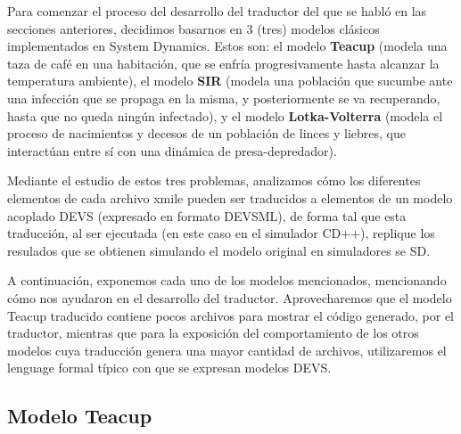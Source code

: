 Para comenzar el proceso del desarrollo del traductor del que se habló en las secciones anteriores, decidimos basarnos en 3 (tres) modelos clásicos implementados en System Dynamics. Estos son: el modelo \textbf{Teacup} (modela una taza de café en una habitación, que se enfría progresivamente hasta alcanzar la temperatura ambiente), el modelo \textbf{SIR} (modela una población que sucumbe ante una infección que se propaga en la misma, y posteriormente se va recuperando, hasta que no queda ningún infectado), y el modelo \textbf{Lotka-Volterra} (modela el proceso de nacimientos y decesos de un población de linces y liebres, que interactúan entre sí con una dinámica de presa-depredador).

Mediante el estudio de estos tres problemas, analizamos cómo los diferentes elementos de cada archivo xmile pueden ser traducidos a elementos de un modelo acoplado DEVS (expresado en formato DEVSML), de forma tal que esta traducción, al ser ejecutada (en este caso en el simulador CD++), replique los resulados que se obtienen simulando el modelo original en simuladores se SD.

A continuación, exponemos cada uno de los modelos mencionados, mencionando cómo nos ayudaron en el desarrollo del traductor. Aprovecharemos que el modelo Teacup traducido contiene pocos archivos para mostrar el código generado, por el traductor, mientras que para la exposición del comportamiento de los otros modelos cuya traducción genera una mayor cantidad de archivos, utilizaremos el lenguage formal típico con que se expresan modelos DEVS.

\subsection{Modelo Teacup}
